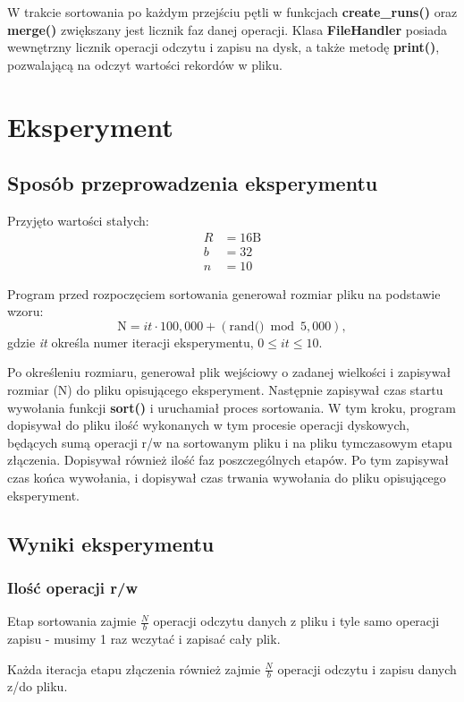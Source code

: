\documentclass{article}
\begin{document}
W trakcie sortowania po każdym przejściu pętli w funkcjach \textbf{create\_runs()} oraz \textbf{merge()} zwiększany jest licznik faz danej operacji. Klasa \textbf{FileHandler} posiada wewnętrzny licznik operacji odczytu i zapisu na dysk, a także metodę \textbf{print()}, pozwalającą na odczyt wartości rekordów w pliku.

\newpage
\section{Eksperyment}
\subsection{Sposób przeprowadzenia eksperymentu}
Przyjęto wartości stałych:
\[
\begin{aligned}
R &= 16\text{B}\\
b &= 32\\
n &= 10
\end{aligned}
\]

Program przed rozpoczęciem sortowania generował rozmiar pliku na podstawie wzoru:
\[
\text{N} = it \cdot 100{,}000 + \left( \text{rand()} \bmod 5{,}000 \right),
\]
gdzie \textit{it} określa numer iteracji eksperymentu, \(0 \le it \le 10\).


Po określeniu rozmiaru, generował plik wejściowy o zadanej wielkości i zapisywał rozmiar (N) do pliku opisującego eksperyment.
Następnie zapisywał czas startu wywołania funkcji \textbf{sort()} i uruchamiał proces sortowania. W tym kroku, program dopisywał do pliku ilość wykonanych w tym procesie operacji dyskowych, będących sumą operacji r/w na sortowanym pliku i na pliku tymczasowym etapu złączenia. Dopisywał również ilość faz poszczególnych etapów. Po tym zapisywał czas końca wywołania, i dopisywał czas trwania wywołania do pliku opisującego eksperyment.


\subsection{Wyniki eksperymentu}
\subsubsection{Ilość operacji r/w}
Etap sortowania zajmie \( \frac{N}{b} \) operacji odczytu danych z pliku i tyle samo operacji zapisu - musimy 1 raz wczytać i zapisać cały plik.

Każda iteracja etapu złączenia również zajmie \( \frac{N}{b} \) operacji odczytu i zapisu danych z/do pliku.
\end{document}
